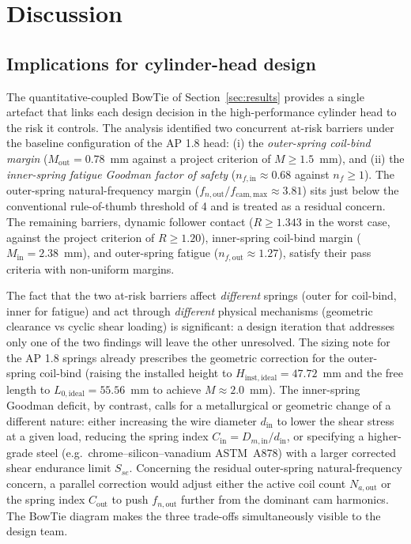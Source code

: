 
\section{Discussion}\label{sec:discussion}

\subsection{Implications for cylinder-head design}
\label{sec:disc-design}

The quantitative-coupled BowTie of Section~\ref{sec:results} provides a
single artefact that links each design decision in the high-performance
cylinder head to the risk it controls. The analysis identified two
concurrent at-risk barriers under the baseline configuration of the
AP 1.8 head: (i) the \emph{outer-spring coil-bind margin}
($M_{\mathrm{out}}=0.78$~mm against a project criterion of
$M\geq 1.5$~mm), and (ii) the \emph{inner-spring fatigue Goodman
factor of safety} ($n_{f,\mathrm{in}}\approx 0.68$ against
$n_{f}\geq 1$). The outer-spring natural-frequency margin
($f_{n,\mathrm{out}}/f_{\mathrm{cam,max}}\approx 3.81$) sits just
below the conventional rule-of-thumb threshold of 4 and is treated
as a residual concern. The remaining barriers, dynamic follower
contact ($R\geq 1.343$ in the worst case, against the project
criterion of $R\geq 1.20$), inner-spring coil-bind margin
($M_{\mathrm{in}}=2.38$~mm), and outer-spring fatigue
($n_{f,\mathrm{out}}\approx 1.27$), satisfy their pass criteria
with non-uniform margins.

The fact that the two at-risk barriers affect \emph{different}
springs (outer for coil-bind, inner for fatigue) and act through
\emph{different} physical mechanisms (geometric clearance vs cyclic
shear loading) is significant: a design iteration that addresses
only one of the two findings will leave the other unresolved. The
sizing note for the AP 1.8 springs already prescribes the geometric
correction for the outer-spring coil-bind (raising the installed
height to $H_{\mathrm{inst,ideal}}=47.72$~mm and the free length to
$L_{0,\mathrm{ideal}}=55.56$~mm to achieve $M\approx 2.0$~mm). The
inner-spring Goodman deficit, by contrast, calls for a metallurgical
or geometric change of a different nature: either increasing the
wire diameter $d_{\mathrm{in}}$ to lower the shear stress at a given
load, reducing the spring index
$C_{\mathrm{in}}=D_{m,\mathrm{in}}/d_{\mathrm{in}}$, or specifying
a higher-grade steel (e.g.\ chrome--silicon--vanadium ASTM~A878)
with a larger corrected shear endurance limit $S_{se}$. Concerning
the residual outer-spring natural-frequency concern, a parallel
correction would adjust either the active coil count
$N_{a,\mathrm{out}}$ or the spring index $C_{\mathrm{out}}$ to push
$f_{n,\mathrm{out}}$ further from the dominant cam harmonics. The
BowTie diagram makes the three trade-offs simultaneously visible to
the design team.

